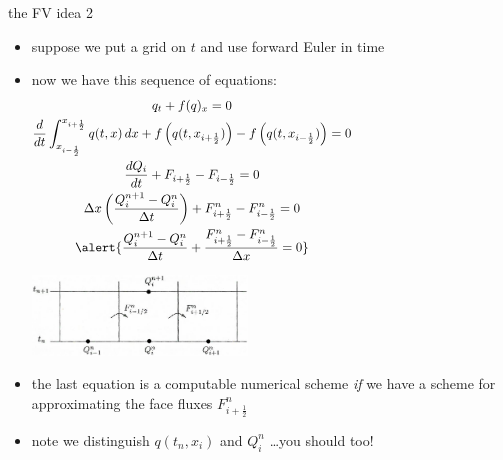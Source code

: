 \documentclass[10pt,hyperref,dvipsnames]{beamer}
\newcommand{\xiphalf}{{x_{i+\frac{1}{2}}}}
\newcommand{\ximhalf}{{x_{i-\frac{1}{2}}}}
\newcommand{\Fiphalf}{{F_{i+\frac{1}{2}}}}
\newcommand{\Fimhalf}{{F_{i-\frac{1}{2}}}}
\newcommand{\Fiphalfn}{{F^n_{i+\frac{1}{2}}}}
\newcommand{\Fimhalfn}{{F^n_{i-\frac{1}{2}}}}
\begin{document}
\begin{frame}{the FV idea 2}

\begin{itemize}
\item suppose we put a grid on $t$ and use forward Euler in time
\item now we have this sequence of equations:
\small
\begin{gather*}
q_t + f(q)_x = 0 \hspace{50mm} \\
\frac{d}{dt} \int_\ximhalf^\xiphalf q(t,x) \,dx + f\left(q(t,\xiphalf)\right) - f\left(q(t,\ximhalf)\right) = 0 \hspace{50mm} \\
\frac{dQ_i}{dt} + \Fiphalf - \Fimhalf = 0 \hspace{50mm} \\
\Delta x \left(\frac{Q_i^{n+1} - Q_i^n}{\Delta t}\right) + \Fiphalfn - \Fimhalfn = 0 \hspace{50mm} \\
\alert{\frac{Q_i^{n+1} - Q_i^n}{\Delta t} + \frac{\Fiphalfn - \Fimhalfn}{\Delta x} = 0} \hspace{50mm}
\end{gather*}

\vspace{-15mm}

\hfill \includegraphics[width=0.45\textwidth]{figs/leveque4p1}

\normalsize
\medskip
\item the \alert{last equation} is a computable numerical scheme \emph{if} we have a scheme for approximating the face fluxes $\Fiphalfn$
\item note we distinguish $q(t_n,x_i)$ and $Q_i^n$ \quad \dots you should too!
\end{itemize}
\end{frame}
\end{document}
